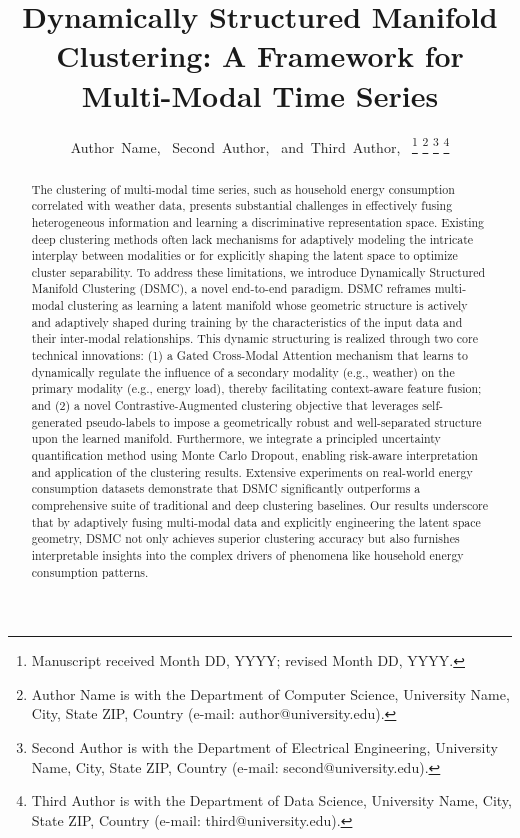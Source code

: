 \documentclass[journal]{IEEEtran}
\begin{document}
\title{Dynamically Structured Manifold Clustering: A Framework for Multi-Modal Time Series}

\author{Author~Name,~
        Second~Author,~
        and~Third~Author,~
\thanks{Manuscript received Month DD, YYYY; revised Month DD, YYYY.}
\thanks{Author Name is with the Department of Computer Science, University Name, City, State ZIP, Country (e-mail: author@university.edu).}
\thanks{Second Author is with the Department of Electrical Engineering, University Name, City, State ZIP, Country (e-mail: second@university.edu).}
\thanks{Third Author is with the Department of Data Science, University Name, City, State ZIP, Country (e-mail: third@university.edu).}}

\maketitle

\begin{abstract}
The clustering of multi-modal time series, such as household energy consumption correlated with weather data, presents substantial challenges in effectively fusing heterogeneous information and learning a discriminative representation space. Existing deep clustering methods often lack mechanisms for adaptively modeling the intricate interplay between modalities or for explicitly shaping the latent space to optimize cluster separability. To address these limitations, we introduce Dynamically Structured Manifold Clustering (DSMC), a novel end-to-end paradigm. DSMC reframes multi-modal clustering as learning a latent manifold whose geometric structure is actively and adaptively shaped during training by the characteristics of the input data and their inter-modal relationships. This dynamic structuring is realized through two core technical innovations: (1) a Gated Cross-Modal Attention mechanism that learns to dynamically regulate the influence of a secondary modality (e.g., weather) on the primary modality (e.g., energy load), thereby facilitating context-aware feature fusion; and (2) a novel Contrastive-Augmented clustering objective that leverages self-generated pseudo-labels to impose a geometrically robust and well-separated structure upon the learned manifold. Furthermore, we integrate a principled uncertainty quantification method using Monte Carlo Dropout, enabling risk-aware interpretation and application of the clustering results. Extensive experiments on real-world energy consumption datasets demonstrate that DSMC significantly outperforms a comprehensive suite of traditional and deep clustering baselines. Our results underscore that by adaptively fusing multi-modal data and explicitly engineering the latent space geometry, DSMC not only achieves superior clustering accuracy but also furnishes interpretable insights into the complex drivers of phenomena like household energy consumption patterns.
\end{abstract}
\end{document}

